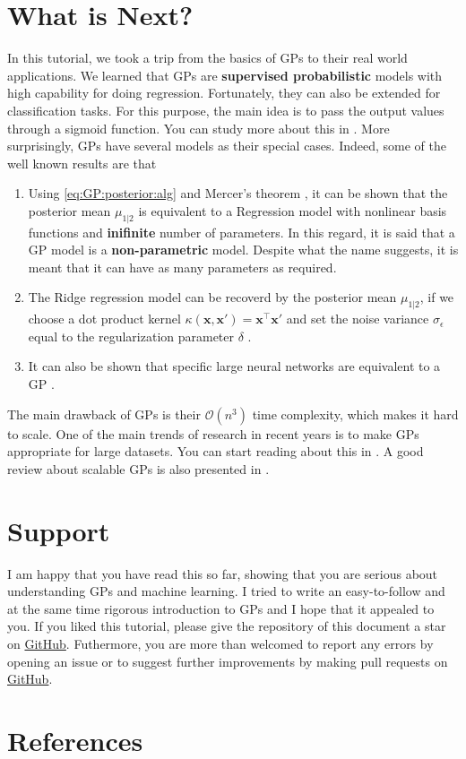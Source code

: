 \documentclass[10pt]{article}
\theoremstyle{definition}
\begin{document}
\section{What is Next?}
In this tutorial, we took a trip from the basics of GPs to their real world applications. We learned that GPs are \textbf{supervised probabilistic} models with high capability for doing regression. Fortunately, they can also be extended for classification tasks. For this purpose, the main idea is to pass the output values  through a sigmoid function. You can study more about this in \cite[Chapter 3]{Rasmussen2006}. More surprisingly, GPs have several models as their special cases. Indeed, some of the well known results are that
\begin{enumerate}[noitemsep]
\item Using \cref{eq:GP:posterior:alg} and Mercer's theorem \cite[Section 4.3]{Rasmussen2006}, it can be shown that the posterior mean $\mu_{1|2}$ is equivalent to a Regression model with nonlinear basis functions and \textbf{inifinite} number of parameters. In this regard, it is said that a GP model is a \textbf{non-parametric} model. Despite what the name suggests, it is meant that it can have as many parameters as required.
\item The Ridge regression model can be recoverd by the posterior mean $\mu_{1|2}$, if we choose a dot product kernel $\kappa(\mathbf{x},\mathbf{x}')=\mathbf{x}^{\top}\mathbf{x}'$ and set the noise variance $\sigma_{\epsilon}$ equal to the regularization parameter $\delta$ \cite[Lecture 9]{Freitas2013}.
\item It can also be shown that specific large neural networks are equivalent to a GP \cite{MacKay1998}.
\end{enumerate}
The main drawback of GPs is their $\mathcal{O}(n^3)$ time complexity, which makes it hard to scale. One of the main trends of research in recent years is to make GPs appropriate for large datasets. You can start reading about this in \cite[Chapter 8]{Rasmussen2006}. A good review about scalable GPs is also presented in \cite{Liu2020}.


\section{Support}
I am happy that you have read this so far, showing that you are serious about understanding GPs and machine learning. I tried to write an easy-to-follow and at the same time rigorous introduction to GPs and I hope that it appealed to you. If you liked this tutorial, please give the repository of this document a star on \href{https://github.com/Hosein-Rahnama/Gaussian-Processes.git}{GitHub}. Futhermore, you are more than welcomed to report any errors by opening an issue or to suggest further improvements by making pull requests on \href{https://github.com/Hosein-Rahnama/Gaussian-Processes.git}{GitHub}.


\newpage
\section{References}
\printbibliography[heading=none]
\end{document}
